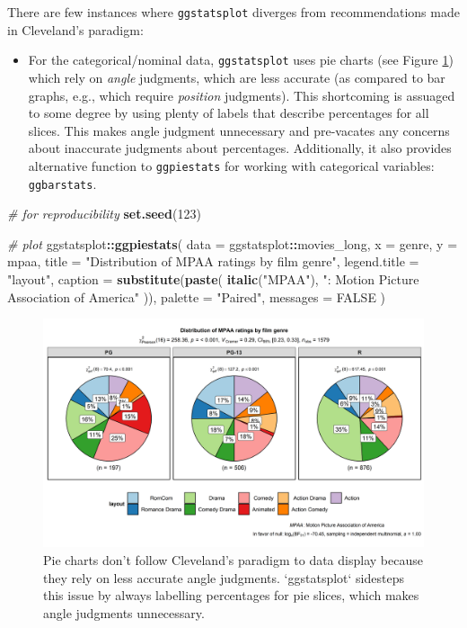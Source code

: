 \documentclass[]{article}
\newenvironment{Shaded}{\begin{snugshade}}{\end{snugshade}}
\newcommand{\CommentTok}[1]{\textcolor[rgb]{0.56,0.35,0.01}{\textit{#1}}}
\newcommand{\DataTypeTok}[1]{\textcolor[rgb]{0.13,0.29,0.53}{#1}}
\newcommand{\DecValTok}[1]{\textcolor[rgb]{0.00,0.00,0.81}{#1}}
\newcommand{\KeywordTok}[1]{\textcolor[rgb]{0.13,0.29,0.53}{\textbf{#1}}}
\newcommand{\NormalTok}[1]{#1}
\newcommand{\OperatorTok}[1]{\textcolor[rgb]{0.81,0.36,0.00}{\textbf{#1}}}
\newcommand{\OtherTok}[1]{\textcolor[rgb]{0.56,0.35,0.01}{#1}}
\newcommand{\StringTok}[1]{\textcolor[rgb]{0.31,0.60,0.02}{#1}}
\providecommand{\tightlist}{%
  \setlength{\itemsep}{0pt}\setlength{\parskip}{0pt}}
\begin{document}
There are few instances where \texttt{ggstatsplot} diverges from recommendations made
in Cleveland's paradigm:

\begin{itemize}
\tightlist
\item
  For the categorical/nominal data, \texttt{ggstatsplot} uses pie charts (see Figure
  \ref{fig:fig2}) which rely on \emph{angle} judgments, which are less accurate (as
  compared to bar graphs, e.g., which require \emph{position} judgments). This
  shortcoming is assuaged to some degree by using plenty of labels that
  describe percentages for all slices. This makes angle judgment unnecessary
  and pre-vacates any concerns about inaccurate judgments about percentages.
  Additionally, it also provides alternative function to \texttt{ggpiestats} for
  working with categorical variables: \texttt{ggbarstats}.
\end{itemize}

\begin{Shaded}
\begin{Highlighting}[]
\CommentTok{# for reproducibility}
\KeywordTok{set.seed}\NormalTok{(}\DecValTok{123}\NormalTok{)}

\CommentTok{# plot}
\NormalTok{ggstatsplot}\OperatorTok{::}\KeywordTok{ggpiestats}\NormalTok{(}
  \DataTypeTok{data =}\NormalTok{ ggstatsplot}\OperatorTok{::}\NormalTok{movies_long,}
  \DataTypeTok{x =}\NormalTok{ genre,}
  \DataTypeTok{y =}\NormalTok{ mpaa,}
  \DataTypeTok{title =} \StringTok{"Distribution of MPAA ratings by film genre"}\NormalTok{,}
  \DataTypeTok{legend.title =} \StringTok{"layout"}\NormalTok{,}
  \DataTypeTok{caption =} \KeywordTok{substitute}\NormalTok{(}\KeywordTok{paste}\NormalTok{(}
    \KeywordTok{italic}\NormalTok{(}\StringTok{"MPAA"}\NormalTok{), }\StringTok{": Motion Picture Association of America"}
\NormalTok{  )),}
  \DataTypeTok{palette =} \StringTok{"Paired"}\NormalTok{,}
  \DataTypeTok{messages =} \OtherTok{FALSE}
\NormalTok{)}
\end{Highlighting}
\end{Shaded}

\begin{figure}[H]
\includegraphics[width=1\linewidth]{./figures/paper-fig2-1} \caption{Pie charts don't follow Cleveland's paradigm to data display because they rely on less accurate angle judgments. `ggstatsplot` sidesteps this issue by always labelling percentages for pie slices, which makes angle judgments unnecessary.}\label{fig:fig2}
\end{figure}
\end{document}
